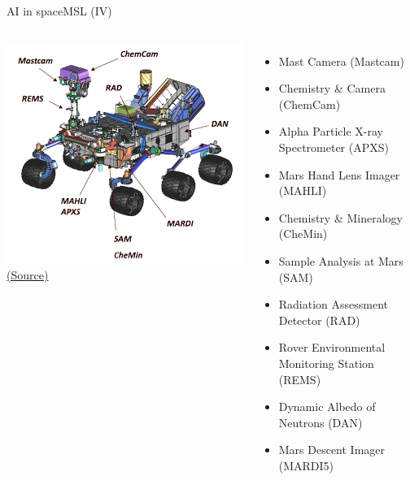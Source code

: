 \documentclass[10pt,compress]{beamer} %
\begin{document}
{	\begin{frame}{AI in space}{MSL (IV)}
		\begin{columns}
				\begin{center}
					\includegraphics[width=\linewidth]{figs/msl.png}\\
					\tiny{\href{http://www.msl-chemcam.com/}{(Source)}}
				\end{center}
				\footnotesize{
				\begin{itemize}
					\item Mast Camera (Mastcam) 
					\item Chemistry \& Camera (ChemCam) 
					\item Alpha Particle X-ray Spectrometer (APXS) 
					\item Mars Hand Lens Imager (MAHLI) 
			 		\item Chemistry \& Mineralogy (CheMin) 
			 		\item Sample Analysis at Mars (SAM) 
			 		\item Radiation Assessment Detector (RAD) 
			 		\item Rover Environmental Monitoring Station (REMS) 
			 		\item Dynamic Albedo of Neutrons (DAN)
			  		\item Mars Descent Imager (MARDI5)
				\end{itemize}
				}
		\end{columns}
	\end{frame}

}
\end{document}

